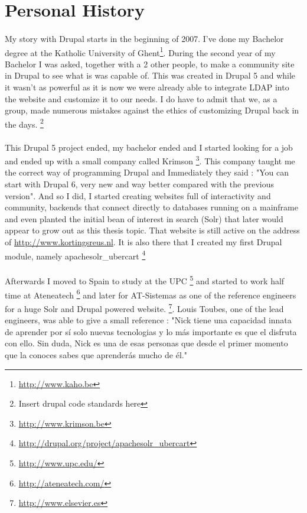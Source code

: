 \section{Personal History}
\paragraph{}
My story with Drupal starts in the beginning of 2007. I've done my Bachelor degree at the Katholic University of Ghent\footnote{\url{http://www.kaho.be}}. During the second year of my Bachelor I was asked, together with a 2 other people, to make a community site in Drupal to see what is was capable of. This was created in Drupal 5 and while it wasn't as powerful as it is now we were already able to integrate LDAP into the website and customize it to our needs. I do have to admit that we, as a group, made numerous mistakes against the ethics of customizing Drupal back in the days. \footnote{Insert drupal code standards here} 

\paragraph{}
This Drupal 5 project ended, my bachelor ended and I started looking for a job and ended up with a small company called Krimson \footnote{\url{http://www.krimson.be}}. This company taught me the correct way of programming Drupal and Immediately they said : "You can start with Drupal 6, very new and way better compared with the previous version". And so I did, I started creating websites full of interactivity and community, backends that connect directly to databases running on a mainframe and even planted the initial bean of interest in search (Solr) that later would appear to grow out as this thesis topic. That website is still active on the address of \url{http://www.kortingsreus.nl}. It is also there that I created my first Drupal module, namely apachesolr\_ubercart \footnote{\url{http://drupal.org/project/apachesolr_ubercart}}
\paragraph{}
Afterwards I moved to Spain to study at the UPC \footnote{\url{http://www.upc.edu/}} and started to work half time at Ateneatech \footnote{\url{http://ateneatech.com/}} and later for AT-Sistemas as one of the reference engineers for a huge Solr and Drupal powered website. \footnote{\url{http://www.elsevier.es}}. Louis Toubes, one of the lead engineers, was able to give a small reference : "Nick tiene una capacidad innata de aprender por sí solo nuevas tecnologias y lo más importante es que el disfruta con ello. Sin duda, Nick es una de esas personas que desde el primer momento que la conoces sabes que aprenderás mucho de él."

